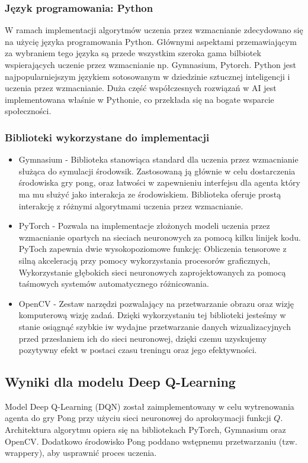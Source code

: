 \documentclass[a4paper, 12pt]{article}
\numberwithin{equation}{section}
\begin{document}
    \subsubsection{Język programowania: Python \cite{python}}
    W ramach implementacji algorytmów uczenia przez wzmacnianie zdecydowano się na użycię języka programowania Python. Głównymi aspektami przemawiającym za wybraniem tego języka są przede wszystkim szeroka gama bilbiotek wspierających uczenie przez wzmacnianie np. Gymnasium, Pytorch. Python jest najpopularniejszym językiem sotosowanym w dziedzinie sztucznej inteligencji i uczenia przez wzmacnianie. Duża część współczesnych rozwiązań w AI jest implementowana właśnie w Pythonie, co przekłada się na bogate wsparcie społeczności.
    \subsubsection{Biblioteki wykorzystane do implementacji}
    \begin{itemize}    
        \item Gymnasium \cite{gymnasium2025} - Biblioteka stanowiąca standard dla uczenia przez wzmacnianie służąca do symulacji środowsik. Zastosowaną ją głównie w celu dostarczenia środowiska gry pong, oraz
        łatwości w zapewnieniu interfejsu dla agenta który ma mu służyć jako interakcja ze środowiskiem. Biblioteka oferuje prostą interakcję z różnymi algorytmami uczenia przez wzmacnianie.
        \item PyTorch \cite{pytorch2025} - Pozwala na implementacje złożonych modeli uczenia przez wzmacnianie opartych na sieciach neuronowych za pomocą kilku linijek kodu. 
        PyToch zapewnia dwie wysokopoziomowe funkcję: Obliczenia tensorowe z silną akceleracją przy pomocy wykorzystania procesorów graficznych, 
        Wykorzystanie głębokich sieci neuronowych zaprojektowanych za pomocą taśmowych systemów automatycznego różnicowania.
        \item OpenCV \cite{opencv2025} - Zestaw narzędzi pozwalający na przetwarzanie obrazu oraz wizję komputerową wizję zadań. Dzięki wykorzystaniu tej biblioteki jesteśmy w stanie
        osiągnąć szybkie iw wydajne przetwarzanie danych wizualizacyjnych przed przesłaniem ich do sieci neuronowej, dzięki czemu uzyskujemy 
        pozytywny efekt w postaci czasu treningu oraz jego efektywności. 
    \end{itemize}
    \subsection{Wyniki dla modelu Deep Q-Learning}
    Model Deep Q-Learning (DQN) został zaimplementowany w celu wytrenowania agenta do gry Pong przy użyciu sieci neuronowej do aproksymacji funkcji \( Q \). Architektura algorytmu opiera się na bibliotekach PyTorch, Gymnasium oraz OpenCV. Dodatkowo środowisko Pong poddano wstępnemu przetwarzaniu (tzw. wrappery), aby usprawnić proces uczenia.
    \newpage
\end{document}
